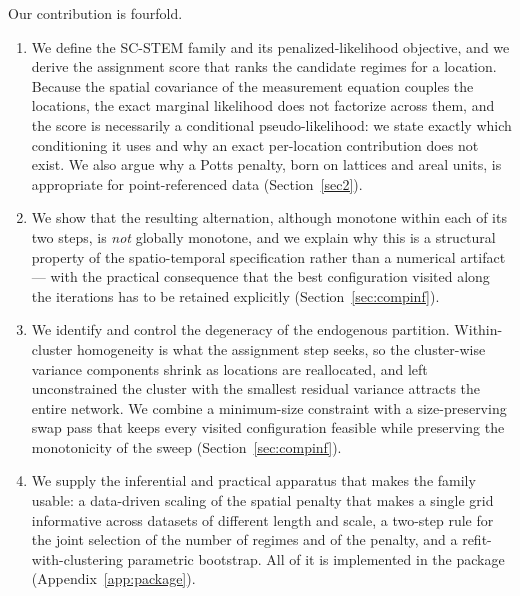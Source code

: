 Our contribution is fourfold.
\begin{enumerate}[leftmargin=*,itemsep=2pt,topsep=3pt]
  \item We define the SC-STEM family and its penalized-likelihood objective, and we derive the assignment score that ranks the candidate regimes for a location. Because the spatial covariance of the measurement equation couples the locations, the exact marginal likelihood does not factorize across them, and the score is necessarily a conditional pseudo-likelihood: we state exactly which conditioning it uses and why an exact per-location contribution does not exist. We also argue why a Potts penalty, born on lattices and areal units, is appropriate for point-referenced data (Section~\ref{sec2}).
  \item We show that the resulting alternation, although monotone within each of its two steps, is \emph{not} globally monotone, and we explain why this is a structural property of the spatio-temporal specification rather than a numerical artifact --- with the practical consequence that the best configuration visited along the iterations has to be retained explicitly (Section~\ref{sec:compinf}).
  \item We identify and control the degeneracy of the endogenous partition. Within-cluster homogeneity is what the assignment step seeks, so the cluster-wise variance components shrink as locations are reallocated, and left unconstrained the cluster with the smallest residual variance attracts the entire network. We combine a minimum-size constraint with a size-preserving swap pass that keeps every visited configuration feasible while preserving the monotonicity of the sweep (Section~\ref{sec:compinf}).
  \item We supply the inferential and practical apparatus that makes the family usable: a data-driven scaling of the spatial penalty that makes a single grid informative across datasets of different length and scale, a two-step rule for the joint selection of the number of regimes and of the penalty, and a refit-with-clustering parametric bootstrap. All of it is implemented in the \Stem{} package (Appendix~\ref{app:package}).
\end{enumerate}


